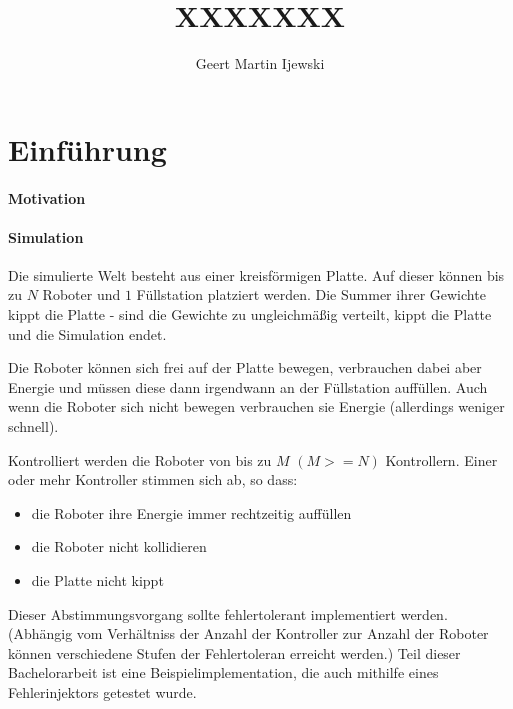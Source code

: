 \documentclass[
    12pt,
    bibliography=totoc,
    ngerman
]{scrartcl}
\title{XXXXXXX}
\author{Geert Martin Ijewski}
\begin{document}
\maketitle
\thispagestyle{empty}

\clearpage
\tableofcontents
\listoffigures
\listoftables
\listoftodos

\clearpage
\section{Einf{\"{u}}hrung}

\paragraph{Motivation} 

\paragraph{Simulation} Die simulierte Welt besteht aus einer kreisf{\"{o}}rmigen Platte. Auf dieser k{\"{o}}nnen bis zu $N$ Roboter und $1$ F{\"{u}}llstation
platziert werden. Die Summer ihrer Gewichte kippt die Platte - sind die Gewichte zu ungleichm{\"{a}}{\ss}ig verteilt, kippt
die Platte und die Simulation endet.

Die Roboter k{\"{o}}nnen sich frei auf der Platte bewegen, verbrauchen dabei aber Energie und m{\"{u}}ssen diese dann irgendwann
an der F{\"{u}}llstation auff{\"{u}}llen. Auch wenn die Roboter sich nicht bewegen verbrauchen sie Energie (allerdings weniger
schnell).

Kontrolliert werden die Roboter von bis zu $M$ $(M >= N)$ Kontrollern. Einer oder mehr Kontroller stimmen sich ab,
so dass:
\begin{itemize}
\item die Roboter ihre Energie immer rechtzeitig auff{\"{u}}llen
\item die Roboter nicht kollidieren
\item die Platte nicht kippt
\end{itemize}

Dieser Abstimmungsvorgang sollte fehlertolerant implementiert werden. (Abh{\"{a}}ngig vom Verh{\"{a}}ltniss der Anzahl der Kontroller zur
Anzahl der Roboter k{\"{o}}nnen verschiedene Stufen der Fehlertoleran erreicht werden.\cite[s.149]{Werner00}) Teil dieser Bachelorarbeit ist eine
Beispielimplementation, die auch mithilfe eines Fehlerinjektors getestet wurde.
\end{document}
